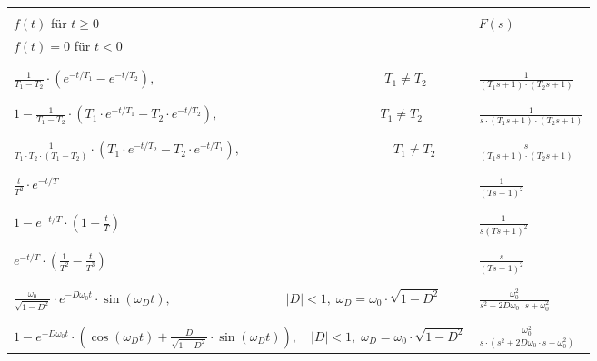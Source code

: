 \begin{tabularx}{\textwidth}{|p{13.5cm}|X|} 
	\hline
	&\\
	\(f(t)\) für \(t\ge 0\) & \multirow{2}{*}{\(F(s)\)} \\
	\(f(t)=0\) für \(t<0\) & \\
	&\\
	\hline
	\hline
	&\\
	\(\frac{1}{T_1-T_2}\cdot\left(e^{-t/T_1}-e^{-t/T_2}\right),\qquad\qquad\qquad\qquad\qquad\qquad\qquad\qquad\qquad T_1\ne T_2\) & \(\frac{1}{\left(T_1s+1\right)\cdot\left(T_2s+1\right)}\) \\
	&\\
	\hline
	&\\
	\(1-\frac{1}{T_1-T_2}\cdot\left(T_1\cdot e^{-t/T_1}-T_2\cdot e^{-t/T_2}\right),\qquad\qquad\qquad\qquad\qquad\qquad\;\;\, T_1\ne T_2\) & \(\frac{1}{s\cdot\left(T_1s+1\right)\cdot\left(T_2s+1\right)}\) \\
	&\\
	\hline
	&\\
	\(\frac{1}{T_1\cdot T_2\cdot \left(T_1-T_2\right)}\cdot\left(T_1\cdot e^{-t/T_2}-T_2\cdot e^{-t/T_1}\right),\qquad\qquad\qquad\qquad\qquad\qquad T_1\ne T_2\) & \(\frac{s}{\left(T_1s+1\right)\cdot\left(T_2s+1\right)}\) \\
	&\\
	\hline
	&\\
	\(\frac{t}{T^2}\cdot e^{-t/T}\) & \(\frac{1}{(Ts+1)^2}\)  \\
	&\\
	\hline
	&\\
	\(1-e^{-t/T}\cdot\left(1+\frac{t}{T}\right)\) & \(\frac{1}{s(Ts+1)^2}\)  \\
	&\\
	\hline
	&\\
	\(e^{-t/T}\cdot\left(\frac{1}{T^2}-\frac{t}{T^3}\right)\) & \(\frac{s}{(Ts+1)^2}\)  \\
	&\\
	\hline
	&\\
	\(\frac{\omega_0}{\sqrt{1-D^2}}\cdot e^{-D\omega_0 t}\cdot\sin\left(\omega_D t\right),\qquad\qquad\qquad\qquad\quad |D|<1,\;\omega_D=\omega_0\cdot\sqrt{1-D^2}\) & \(\frac{\omega_0^2}{s^2+2D\omega_0\cdot s+\omega_0^2}\) \\
	&\\
	\hline
	&\\
	\(1-e^{-D\omega_0 t}\cdot\left(\cos\left(\omega_D t\right)+\frac{D}{\sqrt{1-D^2}}\cdot\sin\left(\omega_D t\right)\right),\quad |D|<1,\;\omega_D=\omega_0\cdot\sqrt{1-D^2}\) & \(\frac{\omega_0^2}{s\cdot\left(s^2+2D\omega_0\cdot s+\omega_0^2\right)}\) \\

\end{tabularx}
